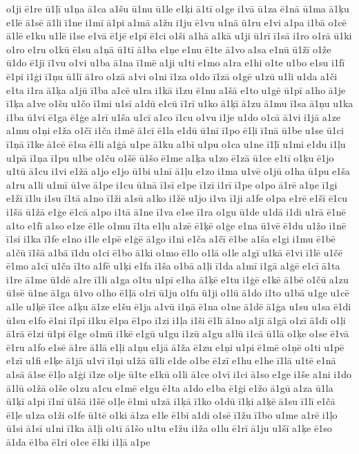 {o1ji
ē1re
ū1ļī
u1ņa
ā1ca
a1šu
ū1nu
ū1le
e1ķi
ā1tī
o1ge
i1vā
ū1za
ē1nā
ū1ma
ā1ķu
e1lē
ā1sē
ā1li
ī1ne
i1mī
ā1pi
a1mā
a1žu
i1ju
ē1vu
u1nā
ū1ru
e1vi
a1pa
i1bā
o1cē
ā1lē
e1ku
u1lē
i1se
e1vā
ē1jē
e1pī
ē1ci
o1ši
a1hā
a1kā
u1ji
ū1rī
ī1sā
i1ro
o1rā
ū1ki
o1ro
e1ru
o1kū
ē1su
a1ņā
ū1tī
ā1ba
e1ņe
e1nu
ē1te
ā1vo
a1sa
e1nū
ū1žī
o1že
ū1do
ē1jī
ī1vu
o1vi
u1ba
ā1na
ī1mē
a1ji
u1ti
e1mo
a1ra
e1hi
o1te
u1bo
e1su
i1fī
ē1pi
i1ģi
ī1ņu
ū1lī
ā1ro
o1zā
a1vi
o1ni
ī1za
o1do
ī1zā
o1gē
u1zū
u1li
u1da
a1či
e1ta
i1ra
ā1ķa
a1jū
ī1ba
a1cē
u1ra
i1kā
i1zu
ē1nu
a1šā
e1to
u1gē
ū1pī
a1ho
ā1je
ī1ķa
a1ve
o1šu
u1čo
ī1mi
u1sī
a1dū
e1cū
ī1rī
u1ko
ā1ķī
ā1zu
ā1mu
ī1sa
ā1ņu
u1ka
i1ba
ū1vi
ē1ga
ē1ģe
a1rī
u1ša
u1cī
a1co
ī1cu
o1vu
i1je
u1do
o1cā
ā1vi
i1jā
a1ze
a1mu
o1ņi
e1ža
o1čī
i1ča
i1mē
ā1cī
ē1la
e1dū
ū1nī
ī1po
ē1ļi
ī1nā
ū1be
u1se
ū1ci
ī1ņā
ī1ke
ā1cē
ē1sa
ē1li
a1ģā
u1pe
ā1ku
a1bī
u1pu
o1ca
u1ne
ī1ļī
u1mi
e1du
i1ļu
u1pā
ī1ņa
ī1pu
u1be
o1ču
o1šē
ū1šo
ē1me
a1ķa
u1zo
ē1zā
ū1ce
e1tī
o1ķu
ē1jo
u1tū
ā1cu
i1vi
e1žā
a1jo
e1jo
ū1bi
u1nī
ā1ļu
e1zo
i1ma
u1vē
o1jū
o1ha
ū1pu
e1ša
a1ru
a1li
u1mī
ū1ve
ā1pe
i1cu
ū1nā
ī1sī
e1pe
ī1zī
i1rī
ī1pe
o1po
ā1rē
a1ņe
ī1gi
e1žī
ī1lu
i1su
ī1tā
a1no
ī1ži
a1sū
a1ko
i1žē
u1jo
i1va
ī1ji
a1fe
o1pa
e1rē
e1šī
ē1cu
i1šā
ū1žā
e1ģe
ē1cā
a1po
i1tā
ā1ne
ī1va
e1se
ī1ra
o1gu
ū1de
u1dā
i1di
u1rā
ē1nē
a1to
e1fī
a1so
e1ze
ē1le
o1mu
ī1ta
e1ļu
a1zē
ē1ķē
o1ģe
e1na
ū1vē
ē1du
u1žo
i1nē
ī1si
i1ka
ī1fe
e1no
i1le
e1pē
e1ģē
ā1go
i1ni
e1ča
a1čī
ē1be
a1ša
e1gi
i1mu
ē1bē
a1čū
ī1šā
a1bā
ī1du
o1ci
ē1bo
ā1ki
o1mo
ē1lo
o1lā
o1le
a1gī
u1kā
ē1vi
ī1lē
u1čē
ē1mo
a1cī
u1ča
ī1to
a1fē
u1ķi
e1fa
ī1ša
o1bā
a1ļi
ī1da
a1mī
i1gā
a1ģē
e1cī
ā1ta
i1re
ā1me
ū1dē
a1re
ī1li
a1ga
o1tu
u1pī
e1ha
ā1ķē
e1tu
i1ģē
e1kē
ā1bē
o1čū
a1zu
ū1sē
ū1ne
ā1ga
ū1vo
o1ho
ē1ļā
o1rī
ū1ju
o1fu
ū1ji
o1lū
ā1do
i1to
u1bā
u1ge
u1cē
a1le
u1ķē
ī1ce
a1ķu
ā1ze
e1šu
ē1ja
a1vū
i1ņā
ē1na
o1ne
ā1dē
ā1ģa
u1su
u1sa
ē1di
ū1su
e1fo
ē1ni
ī1pī
i1ku
ē1pa
ē1po
ī1zi
i1ļa
i1ši
ē1lī
ā1no
a1jī
ā1gā
o1zī
ā1dī
o1ļi
ā1rā
ē1zi
ū1pi
ē1ge
o1mū
i1kē
e1gū
u1gu
i1zū
a1gu
a1lū
i1cā
ū1lā
o1ķe
o1se
ē1vā
ē1ru
a1fo
e1sē
ā1re
ā1lā
e1ļi
a1ņu
e1jā
ā1ža
ē1zu
e1ņi
u1pi
ē1mē
o1ņē
o1ti
u1pē
e1zī
u1fi
e1ķe
ā1jā
u1vī
ī1ņi
u1žā
ū1li
e1de
o1be
ē1zī
e1hu
e1he
ī1lā
u1tē
e1nā
a1sā
ā1se
ē1ļo
a1ģi
ī1ze
o1je
ū1te
e1kū
o1li
ā1ce
o1vī
i1ci
ā1so
e1ge
i1še
a1ni
i1do
ā1lū
o1žā
o1še
o1zu
a1cu
e1mē
e1gu
ē1ta
a1do
e1ba
ē1ģi
e1žo
ā1gū
a1za
ū1la
ū1ķī
a1pi
ī1nī
ū1šā
i1šē
o1ļe
ē1mi
u1zā
i1ķā
ī1ko
o1dū
ī1ķi
a1ķē
ā1su
ī1lī
e1čā
ē1ļe
u1za
o1ži
o1fe
ū1tē
o1ki
ā1za
e1le
ē1bī
a1di
o1sē
ī1žu
ī1bo
u1me
a1rē
i1ļo
ū1si
ā1sī
u1ni
ī1ka
ā1ļi
o1tī
ā1šo
u1tu
e1žu
i1ža
o1lu
ē1rī
ā1ju
u1šī
a1ķe
ē1so
ā1da
ē1ba
ē1ri
o1ce
ē1ki
i1ļā
a1pe
}
